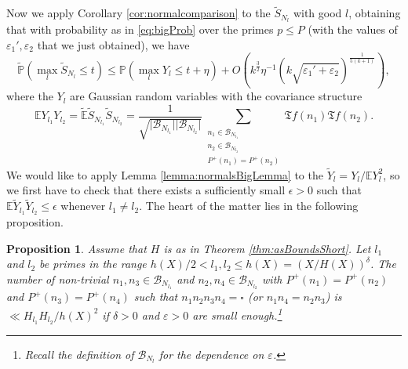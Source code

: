 \documentclass[11pt]{tran-l}
\newtheorem{prop}[theorem]{Proposition}
\theoremstyle{definition}
\theoremstyle{remark}
\numberwithin{equation}{section}
\begin{document}
Now we apply Corollary \ref{cor:normalcomparison} to the $\widetilde{S}_{N_l}$ with good $l$, obtaining that with probability as in \eqref{eq:bigProb} over the primes $p\leq P$ (with the values of $\varepsilon_1', \varepsilon_2$ that we just obtained), we have
  \begin{equation}\label{eq:shortIntsNormal}
        \widetilde{\mathbb P}\left(\max_{l} \widetilde{S}_{N_l} \leq t\right)\leq \mathbb P\left(\max_{l} Y_l\leq t+\eta\right)   + O\left(k^{\frac{3}{2}}\eta^{-1} \left(k\sqrt{\varepsilon_1' + \varepsilon_2}\right)^{\frac1{5(k+1)}}\right),
    \end{equation}
    where the $Y_l$ are Gaussian random variables with the covariance structure 
\begin{equation*}\mathbb E Y_{l_1}Y_{l_2} = \widetilde{\mathbb E}\widetilde{S}_{N_{l_1}}\widetilde{S}_{N_{l_2}} = \frac{1}{\sqrt{\lvert\mathcal B_{N_{l_1}}\rvert\lvert\mathcal B_{N_{l_2}}\rvert}}\sum_{\substack{n_1\in\mathcal B_{N_{l_1}} \\ n_2\in\mathcal B_{N_{l_2}}\\ P^+(n_1) = P^+(n_2)}}\mathfrak Tf(n_1)\mathfrak Tf(n_2).\end{equation*} We would like to apply Lemma \ref{lemma:normalsBigLemma} to the $\widetilde{Y}_l = Y_l/\mathbb EY_l^2$, so we first have to check that there exists a sufficiently small $\epsilon>0$ such that $\mathbb E \widetilde{Y}_{l_1}\widetilde{Y}_{l_2}\leq \epsilon$ whenever $l_1\neq l_2$. The heart of the matter lies in the following proposition. 
\begin{prop}\label{prop:CountAt4Scales}
    Assume that $H$ is as in Theorem \ref{thm:asBoundsShort}. Let $l_1$ and $l_2$ be  primes in the range $h(X)/2 < l_1,  l_2\leq h(X)=(X/H(X))^{\delta}$. The number of non-trivial $n_1, n_3\in\mathcal B_{N_{l_1}}$ and $n_2, n_4\in\mathcal B_{N_{l_2}}$ with $P^+(n_1)=P^+(n_2)$ and $P^+(n_3)=P^+(n_4)$ such that $n_1n_2n_3n_4=\square$ (or $n_1n_4=n_2n_3$) is $\ll H_{l_1}H_{l_2}/h(X)^2$ if $\delta>0$ and $\varepsilon>0$ are small enough.\footnote{Recall the definition of $\mathcal B_{N_l}$ for the dependence on $\varepsilon$.}
\end{prop}
\end{document}
